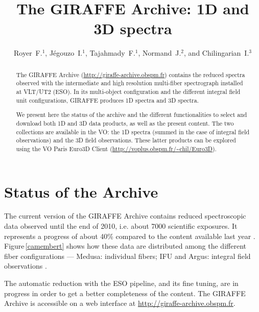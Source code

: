 \documentclass[11pt,twoside]{article}
\begin{document}
\title{The GIRAFFE Archive: 1D and 3D spectra}
\author{Royer~F.$^1$, J\'egouzo~I.$^1$, Tajahmady~F.$^1$, Normand~J.$^2$, and Chilingarian~I.$^3$
}

\begin{abstract}
 The GIRAFFE Archive (\url{http://giraffe-archive.obspm.fr}) contains the reduced spectra observed with the intermediate and high resolution multi-fiber spectrograph installed at VLT/UT2 (ESO). In its multi-object configuration and the different integral field unit configurations, GIRAFFE produces 1D spectra and 3D spectra.

We present here the status of the archive and the different functionalities to select and download both 1D and 3D data products, as well as the present content. The two collections are available in the VO: the 1D spectra (summed in the case of integral field observations) and the 3D field observations. These latter products can be explored using the VO Paris Euro3D Client (\url{http://voplus.obspm.fr/~chil/Euro3D}). 
\end{abstract}

\section{Status of the Archive}

 The current version of the GIRAFFE Archive contains reduced spectroscopic data observed until the end of 2010, i.e. about 7000 scientific exposures. It represents a progress of about 40\% compared to the content available last year \citep{Ror_12}.
Figure\,\ref{camembert} shows how these data are distributed among the different fiber configurations --- Medusa: individual fibers; IFU and Argus: integral field observations \citep[details about the instrument can be found in][]{Pai_02}. 

 The automatic reduction with the ESO pipeline, and its fine tuning, are in progress in order to get a better completeness of the content. The GIRAFFE Archive is accessible on a web interface at \url{http://giraffe-archive.obspm.fr}.
\end{document}
